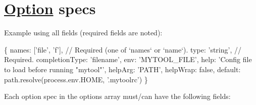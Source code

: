 \section*{\mbox{\hyperlink{structOption}{Option}} specs}

Example using all fields (required fields are noted)\+:


\begin{DoxyCode}
\{
    names: ['file', 'f'],       // Required (one of `names` or `name`).
    type: 'string',             // Required.
    completionType: 'filename',
    env: 'MYTOOL\_FILE',
    help: 'Config file to load before running "mytool"',
    helpArg: 'PATH',
    helpWrap: false,
    default: path.resolve(process.env.HOME, '.mytoolrc')
\}
\end{DoxyCode}


Each option spec in the {\ttfamily options} array must/can have the following fields\+:


